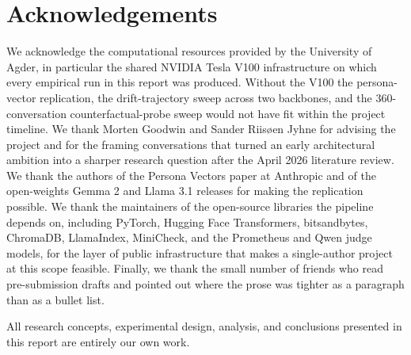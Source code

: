\chapter*{Acknowledgements}

We acknowledge the computational resources provided by the University of Agder, in particular the shared NVIDIA Tesla V100 infrastructure on which every empirical run in this report was produced. Without the V100 the persona-vector replication, the drift-trajectory sweep across two backbones, and the 360-conversation counterfactual-probe sweep would not have fit within the project timeline. We thank Morten Goodwin and Sander Riis{\o}en Jyhne for advising the project and for the framing conversations that turned an early architectural ambition into a sharper research question after the April 2026 literature review. We thank the authors of the Persona Vectors paper at Anthropic and of the open-weights Gemma 2 and Llama 3.1 releases for making the replication possible. We thank the maintainers of the open-source libraries the pipeline depends on, including PyTorch, Hugging Face Transformers, bitsandbytes, ChromaDB, LlamaIndex, MiniCheck, and the Prometheus and Qwen judge models, for the layer of public infrastructure that makes a single-author project at this scope feasible. Finally, we thank the small number of friends who read pre-submission drafts and pointed out where the prose was tighter as a paragraph than as a bullet list.

All research concepts, experimental design, analysis, and conclusions presented in this report are entirely our own work.
